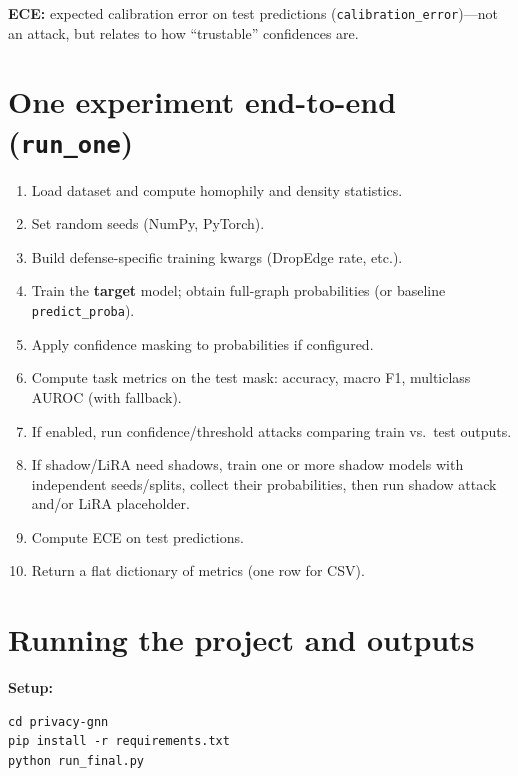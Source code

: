 \documentclass[11pt,a4paper]{article}
\begin{document}
\textbf{ECE:} expected calibration error on test predictions (\texttt{calibration\_error})---not an attack, but relates to how ``trustable'' confidences are.

\section{One experiment end-to-end (\texttt{run\_one})}

\begin{enumerate}
  \item Load dataset and compute homophily and density statistics.
  \item Set random seeds (NumPy, PyTorch).
  \item Build defense-specific training kwargs (DropEdge rate, etc.).
  \item Train the \textbf{target} model; obtain full-graph probabilities (or baseline \texttt{predict\_proba}).
  \item Apply confidence masking to probabilities if configured.
  \item Compute task metrics on the test mask: accuracy, macro F1, multiclass AUROC (with fallback).
  \item If enabled, run confidence/threshold attacks comparing train vs.\ test outputs.
  \item If shadow/LiRA need shadows, train one or more shadow models with independent seeds/splits, collect their probabilities, then run shadow attack and/or LiRA placeholder.
  \item Compute ECE on test predictions.
  \item Return a flat dictionary of metrics (one row for CSV).
\end{enumerate}

\section{Running the project and outputs}

\textbf{Setup:}
\begin{verbatim}
cd privacy-gnn
pip install -r requirements.txt
python run_final.py
\end{verbatim}
\end{document}
